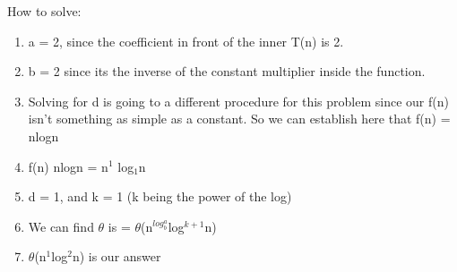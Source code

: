 \documentclass{article}
\begin{document}
How to solve:
\begin{enumerate}
    \item a = 2, since the coefficient in front of the inner T(n) is 2.
    \item b = 2 since its the inverse of the constant multiplier inside the function.
    \item Solving for d is going to a different procedure for this problem since our f(n) isn't something as simple as a constant. So we can establish here that f(n) = nlogn
    \item f(n) nlogn = n$^1$ log$_1$n 
    \item d = 1, and k = 1 (k being the power of the log)
    \item We can find $\theta$ is = $\theta$(n$^{log_b^a}$log$^{k+1}$n)
    \item $\theta$(n$^1$log$^{2}$n) is our answer
\end{enumerate}
\end{document}
